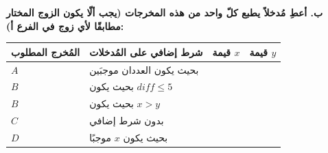 \documentclass[14pt]{extarticle}
\begin{document}
\vspace{0.8cm}
\filbreak

\noindent\textbf{ب. أعطِ مُدخلاً يطبع كلّ واحد من هذه المخرجات (يجب ألّا يكون الزوج المختار مطابقًا لأي زوج في الفرع أ):}
\begin{center}
\renewcommand{\arraystretch}{2.1}
\begin{tabular}{|C{2.5cm}|p{5.8cm}|C{2cm}|C{2cm}|}
\hline
\textbf{المُخرج المطلوب} & \textbf{شرط إضافي على المُدخلات} & \textbf{قيمة $x$} & \textbf{قيمة $y$} \\
\hline
$A$ & بحيث يكون العددان موجبَين & & \\
\hline
$B$ & بحيث يكون $diff \le 5$ & & \\
\hline
$B$ & بحيث يكون $x > y$ & & \\
\hline
$C$ & بدون شرط إضافي & & \\
\hline
$D$ & بحيث يكون $x$ موجبًا & & \\
\hline
\end{tabular}
\end{center}
\fi
\end{document}
